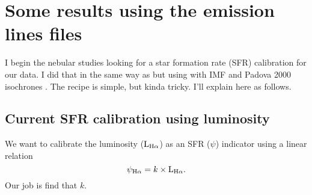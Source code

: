 \documentclass[a4paper,11pt]{article}
\begin{document}
\section{Some results using the emission lines files}

I begin the nebular studies looking for a star formation rate (SFR) calibration for our data. I did that in the same way as \citet[sec. 5.1]{Asari.etal.2007a} but using \citet{BC03a} with \citet{Salpeter.1955a} IMF and Padova 2000 isochrones \citep{Girardi.etal.2000a}. The recipe is simple, but kinda tricky. I'll explain here as follows.

\subsection{Current SFR calibration using \Halpha luminosity}

We want to calibrate the \Halpha luminosity ($\mathrm{L}_{\Halpha}$) as an SFR ($\psi$) indicator \citep[e.g., ][]{Kennicutt.1998a} using a linear relation
\begin{equation}
	\psi_{\Halpha} = k \times \mathrm{L}_{\Halpha}.
	\label{eq:SFRHa}
\end{equation}
\noindent Our job is find that $k$.
\end{document}
